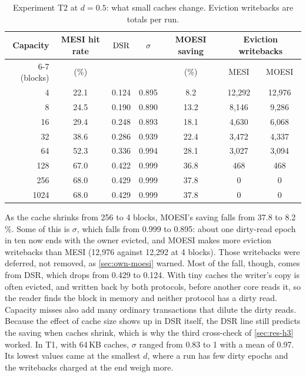 \begin{table}[htbp]
\centering
\caption{Experiment T2 at $d = 0.5$: what small caches change. Eviction writebacks
are totals per run.}
\label{tab:res-sigma}
\small
\begin{tabular}{@{}r c c c c c c@{}}
\toprule
Capacity & MESI hit rate & $\mathrm{DSR}$ & $\sigma$ & MOESI saving & \multicolumn{2}{c}{Eviction writebacks} \\
\cmidrule(lr){6-7}
(blocks) & (\%) & & & (\%) & MESI & MOESI \\
\midrule
4 & 22.1 & 0.124 & 0.895 & 8.2 & 12,292 & 12,976 \\
8 & 24.5 & 0.190 & 0.890 & 13.2 & 8,146 & 9,286 \\
16 & 29.4 & 0.248 & 0.893 & 18.1 & 4,630 & 6,068 \\
32 & 38.6 & 0.286 & 0.939 & 22.4 & 3,472 & 4,337 \\
64 & 52.3 & 0.336 & 0.994 & 28.1 & 3,027 & 3,094 \\
128 & 67.0 & 0.422 & 0.999 & 36.8 & 468 & 468 \\
256 & 68.0 & 0.429 & 0.999 & 37.8 & 0 & 0 \\
1024 & 68.0 & 0.429 & 0.999 & 37.8 & 0 & 0 \\
\bottomrule
\end{tabular}
\end{table}

As the cache shrinks from 256 to 4 blocks, MOESI's saving falls from 37.8 to
8.2\,\%. Some of this is $\sigma$, which falls from 0.999 to 0.895: about one
dirty-read epoch in ten now ends with the owner evicted, and MOESI makes more
eviction writebacks than MESI (12,976 against 12,292 at 4 blocks). Those
writebacks were deferred, not removed, as \cref{sec:own-moesi} warned. Most of the
fall, though, comes from DSR, which drops from 0.429 to 0.124. With tiny caches the
writer's copy is often evicted, and written back by both protocols, before another
core reads it, so the reader finds the block in memory and neither protocol has a
dirty read. Capacity misses also add many ordinary transactions that dilute the
dirty reads. Because the effect of cache size shows up in DSR itself, the DSR line
still predicts the saving when caches shrink, which is why the third cross-check of
\cref{sec:res-h3} worked. In T1, with 64\,KB caches, $\sigma$ ranged from 0.83 to 1
with a mean of 0.97. Its lowest values came at the smallest $d$, where a run has few
dirty epochs and the writebacks charged at the end weigh more.

